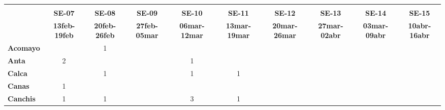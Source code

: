 \begin{tabular}{lccccccccc}
	\textbf{}              	  & \multicolumn{1}{l}{}                        & \multicolumn{1}{l}{}      & \multicolumn{1}{l}{}                         & \multicolumn{1}{l}{}                         & \multicolumn{1}{l}{}                         & \multicolumn{1}{l}{}                        & \multicolumn{1}{l}{}                         & \multicolumn{1}{l}{}                         & \multicolumn{1}{l}{}     \\
	\textbf{}                                                                          
	&\textbf{SE-07}								&\textbf{SE-08}
	&\textbf{SE-09}								&\textbf{SE-10}
	&\textbf{SE-11}								&\textbf{SE-12}
	&\textbf{SE-13} 							&\textbf{SE-14}
	&\textbf{SE-15}\\
	\textbf{}              	  	
	&\textbf{13feb-19feb}
	&\textbf{20feb-26feb}						&\textbf{27feb-05mar}
	&\textbf{06mar-12mar}						&\textbf{13mar-19mar}
	&\textbf{20mar-26mar}						&\textbf{27mar-02abr}
	&\textbf{03mar-09abr}						&\textbf{10abr-16abr}\\
	\textbf{Acomayo}                        		
	&\cellcolor[HTML]{FCC46C}					&1
	&\cellcolor[HTML]{FCC46C}					&\cellcolor[HTML]{FCC46C} 
	&\cellcolor[HTML]{FCC46C}					&\cellcolor[HTML]{FCC46C}
	&\cellcolor[HTML]{FCC46C}					&\cellcolor[HTML]{FCC46C}
	&\cellcolor[HTML]{FCC46C}\\
	\textbf{Anta}                                                   		
	&2
	&\cellcolor[HTML]{FCC46C}					&\cellcolor[HTML]{FCC46C}					&1
	&\cellcolor[HTML]{FCC46C}					&\cellcolor[HTML]{FCC46C}
	&\cellcolor[HTML]{FCC46C}					&\cellcolor[HTML]{FCC46C}
	&\cellcolor[HTML]{FCC46C}\\
	\textbf{Calca}      				       								            
	&\cellcolor[HTML]{FCC46C}					&1											&\cellcolor[HTML]{FCC46C} 					&1											&1											&\cellcolor[HTML]{FCC46C}		   			&\cellcolor[HTML]{FCC46C}		     		&\cellcolor[HTML]{FCC46C}
	&\cellcolor[HTML]{FCC46C}\\             			
	\textbf{Canas}                              		
	&1											&\cellcolor[HTML]{FCC46C}
	&\cellcolor[HTML]{FCC46C}					&\cellcolor[HTML]{FCC46C}
	&\cellcolor[HTML]{FCC46C} 					&\cellcolor[HTML]{FCC46C}
	&\cellcolor[HTML]{FCC46C}					&\cellcolor[HTML]{FCC46C}
	&\cellcolor[HTML]{FCC46C}\\
	\textbf{Canchis}                             		
	&1											&1
	&\cellcolor[HTML]{FCC46C}					&3
	&1											&\cellcolor[HTML]{FCC46C}
	&\cellcolor[HTML]{FCC46C}					&\cellcolor[HTML]{FCC46C}

\end{tabular}
